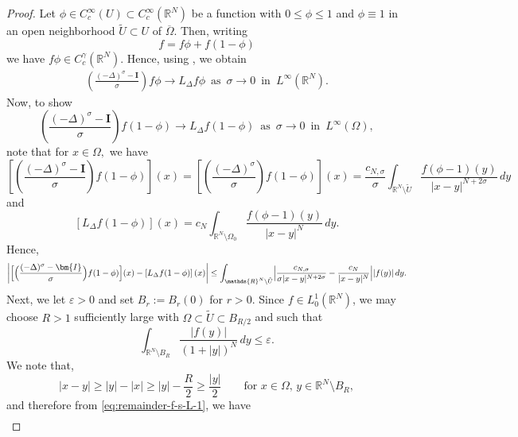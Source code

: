 \documentclass[notitlepage,11pt,reqno]{amsart}
\theoremstyle{definition}
\numberwithin{equation}{section}
\newcommand{\eps}{{\varepsilon}}
\newcommand{\R}{\mathds{R}}
\newcommand{\RR}{\mathds{R}}
\newcommand{\id}{\bm{I}}
\begin{document}
\begin{proof}
Let $\phi\in C^{\infty}_c(U) \subset C^\infty_c(\R^N)$ be a function with $0\leq \phi\leq 1$ and $\phi\equiv 1$ in an open neighborhood $\tilde U \subset U$ of $\overline{\Omega}$. Then, writing
$$
f=f \phi +f\left(1-\phi\right)
$$
we have  $f \phi \in C^{\gamma}_c(\RR^N)$. Hence, using \cite[Theorem 1.1]{CW19}, we obtain
\begin{align*}
 \left(\frac{(-\Delta)^{\sigma}-\id}{\sigma}\right)f\phi\to L_{\Delta}f\phi\,\,\, \text{as}\,\,\, \sigma \to 0\,\,\, \text{in}\,\,\, L^{\infty}(\RR^N).  
\end{align*}
Now, to show
\begin{equation}
\label{asdfg}
\left(\frac{(-\Delta)^{\sigma}-\id}{\sigma}\right)f(1-\phi) \to  L_{\Delta}f(1-\phi)\,\,\, \text{as}\,\,\, \sigma\to 0\,\,\, \text{in}\,\,\, L^{\infty}(\Omega),   
\end{equation}
note that for $x \in \Omega,$ we have 
\begin{equation*}\label{asdfg-2}
  \left[\left(\frac{(-\Delta)^{\sigma}-\id}{\sigma}\right)f(1-\phi)\right](x)=
  \left[\left(\frac{(-\Delta)^{\sigma}}{\sigma}\right)f(1-\phi)\right](x)= \frac{c_{N, \sigma}}{\sigma}\int_{\RR^N\setminus \tilde U}\frac{f(\phi-1)(y)}{|x-y|^{N+2\sigma}}\,dy 
\end{equation*}
and 
\begin{equation*}\label{asdfg-1}
  \left[L_{\Delta}f(1-\phi)\right](x)= c_N \int_{\RR^N\setminus \Omega_0}\frac{f(\phi-1)(y)}{|x-y|^{N}}\,dy. 
\end{equation*}
Hence,
\begin{align}
\left|  \Bigl[\Bigl(\frac{(-\Delta)^{\sigma}-\id}{\sigma}\Bigr)f(1-\phi)\Bigr](x)-  \left[L_{\Delta}f(1-\phi)\right](x) \right| \le \int_{\RR^N\setminus \tilde U}\Bigl|\frac{c_{N, \sigma}}{\sigma |x-y|^{N+2\sigma}}- \frac{c_N}{|x-y|^{N}}\Bigr||f(y)| \,dy.  \label{asdfg-3}
\end{align}
Next, we let $\eps>0$ and set $B_r:= B_r(0)$ for $r>0$. Since $f \in L^1_0(\R^N)$, we may choose $R>1$ sufficiently large with $\Omega \subset \tilde U \subset B_{R/2}$ and such that 
\begin{equation}
  \label{eq:remainder-f-s-L-1}
\int_{\R^N \setminus B_R} \frac{|f(y)|}{(1+|y|)^N} \,dy \le \eps.
\end{equation}
We note that,
$$
|x-y| \ge |y|-|x| \ge |y|- \frac{R}{2} \ge \frac{|y|}{2} \qquad \text{for $x \in \Omega$, $y \in \R^N \setminus B_R$},
$$
and therefore from \eqref{eq:remainder-f-s-L-1}, we have
\begin{align*}

\end{align*}
\end{proof}
\end{document}
